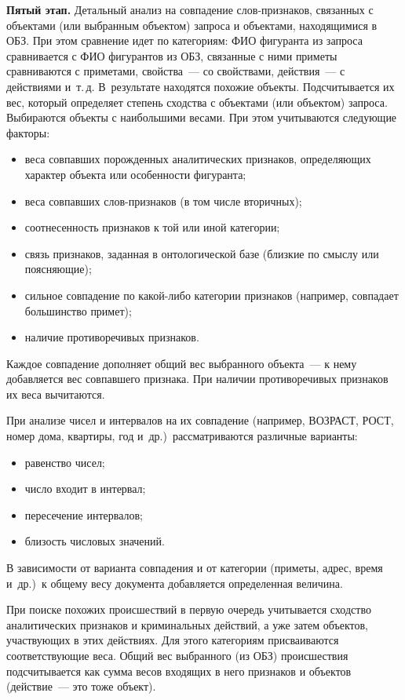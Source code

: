 \begin{multicols}{2}
    \textbf{Пятый этап.} Детальный анализ на совпадение слов-признаков, 
связанных с объектами (или выбранным объектом) запроса и объектами, 
находящимися в ОБЗ. При этом сравнение идет по категориям: ФИО фигуранта 
из запроса сравнивается с ФИО фигурантов из ОБЗ, связанные с ними приметы 
сравниваются с приметами, свойства~--- со свойствами, действия~--- с 
действиями и~т.\,д. В~результате находятся похожие объекты. Подсчитывается 
их вес, который определяет степень сходства с объектами (или объектом) 
запроса. Выбираются объекты с наибольшими весами. При этом учитываются 
следующие факторы:
    \begin{itemize}
    \item веса совпавших порожденных аналитических признаков, 
определяющих характер объекта или особенности фигуранта;
    \item веса совпавших слов-признаков (в том числе вторичных);
    \item соотнесенность признаков к той или иной категории;
    \item связь признаков, заданная в онтологической базе (близкие по смыслу 
или поясняющие);
    \item сильное совпадение по какой-либо категории признаков (например, 
совпадает большинство примет);
    \item наличие противоречивых признаков.
    \end{itemize}
    
    Каждое совпадение дополняет общий вес выбранного объекта~--- к нему 
добавляется вес совпавшего признака. При наличии противоречивых признаков 
их веса вычитаются.
    
    При анализе чисел и интервалов на их совпадение (например, ВОЗРАСТ, 
РОСТ, номер дома, квартиры, год и~др.)\ рассматриваются различные 
варианты:
    \begin{itemize}
    \item равенство чисел;
    \item число входит в интервал;
    \item пересечение интервалов;
    \item близость числовых значений.
    \end{itemize}
    
    В зависимости от варианта совпадения и от категории (приметы, адрес, 
время и~др.)\ к общему весу документа добавляется определенная величина.
    
    При поиске похожих происшествий в первую очередь учитывается 
сходство аналитических признаков и криминальных действий, а уже затем 
объектов, участвующих в этих действиях. Для \mbox{этого} категориям присваиваются 
соответствующие веса. Общий вес выбранного (из ОБЗ) происшествия 
подсчитывается как сумма весов входящих в него признаков и объектов 
(действие~--- это тоже объект).
    

\end{multicols}
